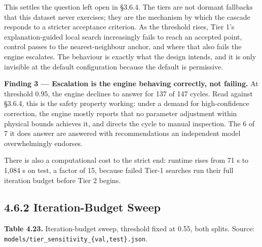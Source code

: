 This settles the question left open in §3.6.4. The tiers are not dormant fallbacks that this dataset never exercises; they are the mechanism by which the cascade responds to a stricter acceptance criterion. As the threshold rises, Tier 1's explanation-guided local search increasingly fails to reach an accepted point, control passes to the nearest-neighbour anchor, and where that also fails the engine escalates. The behaviour is exactly what the design intends, and it is only invisible at the default configuration because the default is permissive.

\textbf{Finding 3 --- Escalation is the engine behaving correctly, not failing.} At threshold 0.95, the engine declines to answer for 137 of 147 cycles. Read against §3.6.4, this is the safety property working: under a demand for high-confidence correction, the engine mostly reports that no parameter adjustment within physical bounds achieves it, and directs the cycle to manual inspection. The 6 of 7 it does answer are answered with recommendations an independent model overwhelmingly endorses.

There is also a computational cost to the strict end: runtime rises from 71 s to 1,084 s on test, a factor of 15, because failed Tier-1 searches run their full iteration budget before Tier 2 begins.

\hypertarget{iteration-budget-sweep}{%
\subsection{4.6.2 Iteration-Budget Sweep}\label{iteration-budget-sweep}}

\textbf{Table 4.23.} Iteration-budget sweep, threshold fixed at 0.55, both splits. Source: \texttt{models/tier\_sensitivity\_\{val,test\}.json}.


